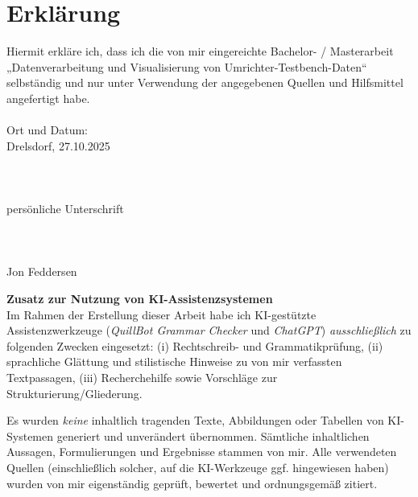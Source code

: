 \newpage
\section{Erklärung}
\label{sec:erklarung}
\label{sec:erklärung}

Hiermit erkläre ich, dass ich die von mir eingereichte Bachelor- / Masterarbeit
„Datenverarbeitung und Visualisierung von Umrichter-Testbench-Daten“ selbständig und nur unter Verwendung der
angegebenen Quellen und Hilfsmittel angefertigt habe.
\\
\\
Ort und Datum:\\
Drelsdorf, 27.10.2025
\\
\\
\\
\\
persönliche Unterschrift
\\
\\
\\
\\
Jon Feddersen


\medskip
\noindent\textbf{Zusatz zur Nutzung von KI-Assistenzsystemen}\\
Im Rahmen der Erstellung dieser Arbeit habe ich KI-gestützte Assistenzwerkzeuge
(\emph{QuillBot Grammar Checker} und \emph{ChatGPT})
\emph{ausschließlich} zu folgenden Zwecken eingesetzt:
(i) Rechtschreib- und Grammatikprüfung,
(ii) sprachliche Glättung und stilistische Hinweise zu von mir verfassten Textpassagen,
(iii) Recherchehilfe sowie Vorschläge zur Strukturierung/Gliederung.

Es wurden \emph{keine} inhaltlich tragenden Texte, Abbildungen oder Tabellen von KI-Systemen generiert und unverändert übernommen. Sämtliche inhaltlichen Aussagen, Formulierungen und Ergebnisse stammen von mir.
Alle verwendeten Quellen (einschließlich solcher, auf die KI-Werkzeuge ggf. hingewiesen haben) wurden von mir eigenständig geprüft, bewertet und ordnungsgemäß zitiert.
